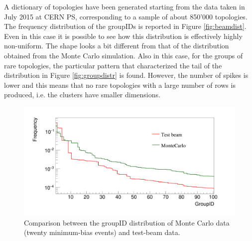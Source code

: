 %
A dictionary of topologies have been generated starting from the data taken in July 2015 at CERN PS, corresponding to a sample of about 850'000 topologies. The frequency distribution of the groupIDs is reported in Figure \ref{fig:beamdist}. Even in this case it is possible to see how this distribution is effectively highly non-uniform. The shape looks a bit different from that of the distribution obtained from the Monte Carlo simulation. Also in this case, for the groups of rare topologies, the particular pattern that characterized the tail of the distribution in Figure \ref{fig:groupdistr} is found. However, the number of spikes is lower and this means that no rare topologies with a large number of rows is produced, i.e. the clusters have smaller dimensions.
%
\begin{figure}
  \centering
  \includegraphics[scale=0.22]{figures/realcomp.png}
  \caption{Comparison between the groupID distribution of Monte Carlo data (twenty minimum-bias events) and test-beam data.}
  \label{fig:realcomp}
\end{figure}
%
